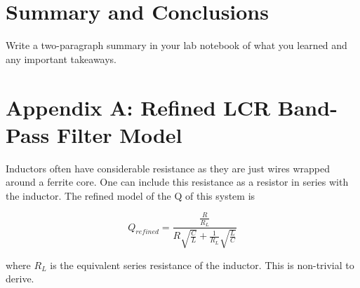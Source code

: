 \documentclass[10pt]{PhysLab1C} %
\begin{document}

\section{Summary and Conclusions}

Write a two-paragraph summary in your lab notebook of what you learned
and any important takeaways.


\section*{Appendix A: Refined LCR Band-Pass Filter Model}



Inductors often have considerable resistance as they are just wires
wrapped around a ferrite core. One can include this resistance as a
resistor in series with the inductor. The refined model of the Q of this
system is

\[Q_{refined} = \frac{\frac{R}{R_{L}}}{R\sqrt{\frac{C}{L}} + \frac{1}{R_{L}}\sqrt{\frac{L}{C}}}\]

where \(R_L\) is the equivalent series resistance of the inductor. This
is non-trivial to derive.
\end{document}
